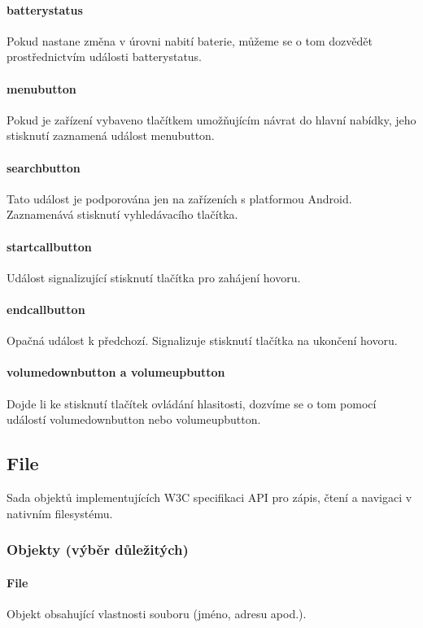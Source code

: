 \paragraph{batterystatus}
Pokud nastane změna v úrovni nabití baterie, můžeme se o tom dozvědět prostřednictvím události batterystatus.

\paragraph{menubutton}
Pokud je zařízení vybaveno tlačítkem umožňujícím návrat do hlavní nabídky, jeho stisknutí zaznamená událost menubutton.

\paragraph{searchbutton}
Tato událost je podporována jen na zařízeních s platformou Android. Zaznamenává stisknutí vyhledávacího tlačítka.

\paragraph{startcallbutton}
Událost signalizující stisknutí tlačítka pro zahájení hovoru.

\paragraph{endcallbutton}
Opačná událost k předchozí. Signalizuje stisknutí tlačítka na ukončení hovoru.

\paragraph{volumedownbutton a volumeupbutton}
Dojde li ke stisknutí tlačítek ovládání hlasitosti, dozvíme se o tom pomocí událostí volumedownbutton nebo volumeupbutton.

\subsection{File}
Sada objektů implementujících W3C specifikaci API pro zápis, čtení a navigaci v nativním filesystému.

\subsubsection{Objekty (výběr důležitých)}
\paragraph{File}
Objekt obsahující vlastnosti souboru (jméno, adresu apod.).


